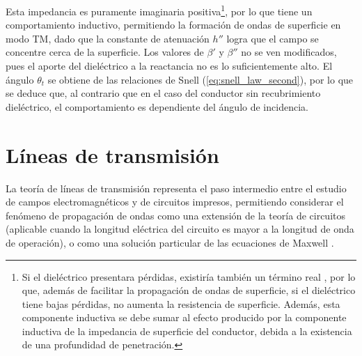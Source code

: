

Esta impedancia es puramente imaginaria positiva\footnote{Si el dieléctrico presentara pérdidas, existiría también un término real \cite{Barlow:SurfaceWaves}, por lo que, además de facilitar la propagación de ondas de superficie, si el dieléctrico tiene bajas pérdidas, no aumenta la resistencia de superficie. Además, esta componente inductiva se debe sumar al efecto producido por la componente inductiva de la impedancia de superficie del conductor, debida a la existencia de una profundidad de penetración.}, por lo que tiene un comportamiento inductivo, permitiendo la formación de ondas de superficie en modo TM, dado que la constante de atenuación $h''$ logra que el campo se concentre cerca de la superficie. Los valores de $\beta'$ y $\beta''$ no se ven modificados, pues el aporte del dieléctrico a la reactancia no es lo suficientemente alto. El ángulo $\theta_t$ se obtiene de las relaciones de Snell (\ref{eq:snell_law_second}), por lo que se deduce que, al contrario que en el caso del conductor sin recubrimiento dieléctrico, el comportamiento es dependiente del ángulo de incidencia.





\section{Líneas de transmisión}
\label{sec_lineas_de_transmision}


La teoría de líneas de transmisión representa el paso intermedio entre el estudio de campos electromagnéticos y de circuitos impresos, permitiendo considerar el fenómeno de propagación de ondas como una extensión de la teoría de circuitos (aplicable cuando la longitud eléctrica del circuito es mayor a la longitud de onda de operación), o como una solución particular de las ecuaciones de Maxwell \cite{Pozar:MwEngineering}.

